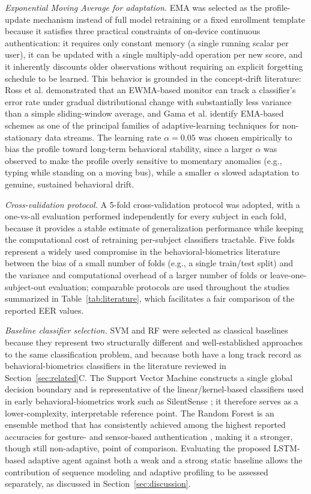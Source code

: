 \documentclass[3p,times,procedia]{elsarticle}
\begin{document}
\textit{Exponential Moving Average for adaptation.} EMA was
selected as the profile-update mechanism instead of full model
retraining or a fixed enrollment template because it satisfies
three practical constraints of on-device continuous
authentication: it requires only constant memory (a single
running scalar per user), it can be updated with a single
multiply-add operation per new score, and it inherently
discounts older observations without requiring an explicit
forgetting schedule to be learned. This behavior is grounded in
the concept-drift literature: Ross et al.
\cite{ross_exponentially_2012} demonstrated that an
EWMA-based monitor can track a classifier's error rate under
gradual distributional change with substantially less variance
than a simple sliding-window average, and Gama et al.
\cite{gama_survey_2014} identify EMA-based schemes as one of
the principal families of adaptive-learning techniques for
non-stationary data streams. The learning rate $\alpha = 0.05$
was chosen empirically to bias the profile toward long-term
behavioral stability, since a larger $\alpha$ was observed to
make the profile overly sensitive to momentary anomalies (e.g.,
typing while standing on a moving bus), while a smaller
$\alpha$ slowed adaptation to genuine, sustained behavioral
drift.

\textit{Cross-validation protocol.} A 5-fold cross-validation
protocol was adopted, with a one-vs-all evaluation performed
independently for every subject in each fold, because it
provides a stable estimate of generalization performance while
keeping the computational cost of retraining per-subject
classifiers tractable. Five folds represent a widely used
compromise in the behavioral-biometrics literature between the
bias of a small number of folds (e.g., a single train/test
split) and the variance and computational overhead of a larger
number of folds or leave-one-subject-out evaluation;
comparable protocols are used throughout the studies
summarized in Table~\ref{tab:literature}, which facilitates a
fair comparison of the reported EER values.

\textit{Baseline classifier selection.} SVM and RF were
selected as classical baselines because they represent two
structurally different and well-established approaches to the
same classification problem, and because both have a long
track record as behavioral-biometrics classifiers in the
literature reviewed in Section~\ref{sec:related}C. The Support
Vector Machine \cite{cortes_supportvector_1995} constructs a
single global decision boundary and is representative of the
linear/kernel-based classifiers used in early
behavioral-biometrics work such as SilentSense
\cite{bo_silentsense_2013}; it therefore serves as a
lower-complexity, interpretable reference point. The Random
Forest \cite{breiman_random_2001} is an ensemble method that has
consistently achieved among the highest reported accuracies for
gesture- and sensor-based authentication
\cite{abuhamad_autosen_2020}, making it a stronger, though
still non-adaptive, point of comparison. Evaluating the
proposed LSTM-based adaptive agent against both a weak and a
strong static baseline allows the contribution of sequence
modeling and adaptive profiling to be assessed separately, as
discussed in Section~\ref{sec:discussion}.
\end{document}
